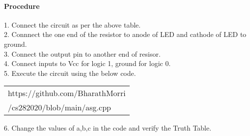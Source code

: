 \documentclass[journal,12pt,twocolumn]{IEEEtran}
\begin{document}
    \paragraph{Procedure}
    
    1. Connect the circuit as per the above table.\\
    2. Connnect the one end of the resistor to anode of LED and cathode of LED to ground.\\
    3. Connect the output pin to another end of resisor.\\
    4. Connect inputs to Vcc for logic 1, ground for logic 0.\\
    5. Execute the circuit using the below code.\\
   
\begin{tabularx}{0.46\textwidth} { 
  | >{\centering\arraybackslash}X |}
  \hline
  https://github.com/BharathMorri\\
	/cs282020/blob/main/asg.cpp\\
  \hline
\end{tabularx}
   
6. Change the values of a,b,c in the code and verify the Truth Table.\\

\end{document}
